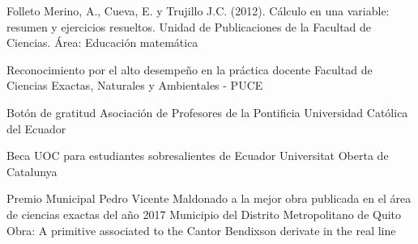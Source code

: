 \documentclass[
	a4paper,
	maincolor=cvblue!70!blue,
	sidecolor=gray!30,
	sectioncolor=cvblue!70!blue,
    sidebarwidth=7.5cm,
	topbottommargin=20pt,
	leftrightmargin=20pt,
]{fortysecondscv}
\begin{document}
    {Folleto}
    {Merino, A., Cueva, E. y Trujillo J.C. (2012). Cálculo en una variable: resumen y ejercicios resueltos. Unidad de Publicaciones de la Facultad de Ciencias.}
    {}
    {Área: Educación matemática}
    


    {Reconocimiento por el alto desempeño en la práctica docente}
    {Facultad de Ciencias Exactas, Naturales y Ambientales - PUCE}
    {}

    {Botón de gratitud}
    {Asociación de Profesores de la Pontificia Universidad Católica del Ecuador}
    {}

    {Beca UOC para estudiantes sobresalientes de Ecuador}
    {Universitat Oberta de Catalunya}
    {}
    
    {Premio Municipal Pedro Vicente Maldonado a la mejor obra publicada en el área de ciencias exactas del año 2017}
    {Municipio del Distrito Metropolitano de Quito}
    {Obra: A primitive associated to the Cantor Bendixson derivate in the real line}
    

\end{document}
